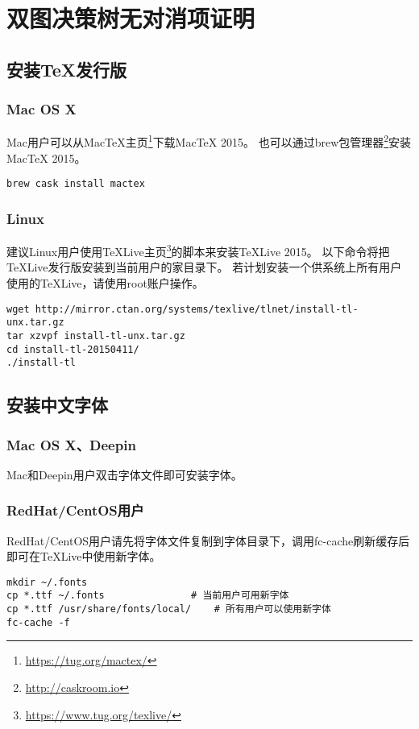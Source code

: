 \chapter{双图决策树无对消项证明}

\section{安装TeX发行版}

\subsection{Mac OS X}

Mac用户可以从MacTeX主页\footnote{\url{https://tug.org/mactex/}}下载MacTeX 2015。
也可以通过brew包管理器\footnote{\url{http://caskroom.io}}安装MacTeX 2015。

\begin{lstlisting}[basicstyle=\small\ttfamily, numbers=none]
brew cask install mactex
\end{lstlisting}

\subsection{Linux}

建议Linux用户使用TeXLive主页\footnote{\url{https://www.tug.org/texlive/}}的脚本来安装TeXLive 2015。
以下命令将把TeXLive发行版安装到当前用户的家目录下。
若计划安装一个供系统上所有用户使用的TeXLive，请使用root账户操作。

\begin{lstlisting}[basicstyle=\small\ttfamily, numbers=none]
wget http://mirror.ctan.org/systems/texlive/tlnet/install-tl-unx.tar.gz
tar xzvpf install-tl-unx.tar.gz
cd install-tl-20150411/
./install-tl
\end{lstlisting}

\section{安装中文字体}

\subsection{Mac OS X、Deepin}

Mac和Deepin用户双击字体文件即可安装字体。

\subsection{RedHat/CentOS用户}

RedHat/CentOS用户请先将字体文件复制到字体目录下，调用fc-cache刷新缓存后即可在TeXLive中使用新字体。

\begin{lstlisting}[basicstyle=\small\ttfamily, numbers=none]
mkdir ~/.fonts
cp *.ttf ~/.fonts				# 当前用户可用新字体
cp *.ttf /usr/share/fonts/local/	# 所有用户可以使用新字体
fc-cache -f
\end{lstlisting}


